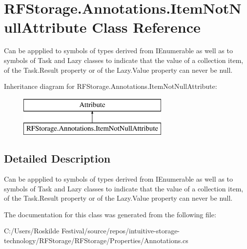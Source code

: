 \section{R\+F\+Storage.\+Annotations.\+Item\+Not\+Null\+Attribute Class Reference}
\label{class_r_f_storage_1_1_annotations_1_1_item_not_null_attribute}


Can be appplied to symbols of types derived from I\+Enumerable as well as to symbols of Task and Lazy classes to indicate that the value of a collection item, of the Task.\+Result property or of the Lazy.\+Value property can never be null.  


Inheritance diagram for R\+F\+Storage.\+Annotations.\+Item\+Not\+Null\+Attribute\+:\begin{figure}[H]
\begin{center}
\leavevmode
\includegraphics[height=2.000000cm]{class_r_f_storage_1_1_annotations_1_1_item_not_null_attribute}
\end{center}
\end{figure}


\subsection{Detailed Description}
Can be appplied to symbols of types derived from I\+Enumerable as well as to symbols of Task and Lazy classes to indicate that the value of a collection item, of the Task.\+Result property or of the Lazy.\+Value property can never be null. 



The documentation for this class was generated from the following file\+:\begin{DoxyCompactItemize}
\item 
C\+:/\+Users/\+Roskilde Festival/source/repos/intuitive-\/storage-\/technology/\+R\+F\+Storage/\+R\+F\+Storage/\+Properties/Annotations.\+cs\end{DoxyCompactItemize}
